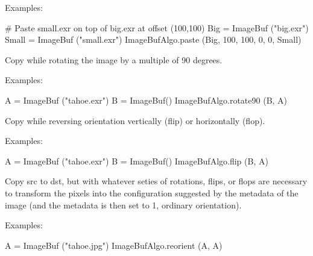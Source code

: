 \smallskip
\noindent Examples:
\begin{code}
    # Paste small.exr on top of big.exr at offset (100,100)
    Big = ImageBuf ("big.exr")
    Small = ImageBuf ("small.exr")
    ImageBufAlgo.paste (Big, 100, 100, 0, 0, Small)
\end{code}
\apiend


 
 
 
Copy while rotating the image by a multiple of 90 degrees.

\smallskip
\noindent Examples:
\begin{code}
    A = ImageBuf ("tahoe.exr")
    B = ImageBuf()
    ImageBufAlgo.rotate90 (B, A)
\end{code}
\apiend



 
 
Copy while reversing orientation vertically (flip) or horizontally (flop).

\smallskip
\noindent Examples:
\begin{code}
    A = ImageBuf ("tahoe.exr")
    B = ImageBuf()
    ImageBufAlgo.flip (B, A)
\end{code}
\apiend


 

Copy {\cf src} to {\cf dst}, but with whatever seties of rotations, flips,
or flops are necessary to transform the pixels into the configuration
suggested by the  metadata of the image (and the
 metadata is then set to 1, ordinary orientation).

\smallskip
\noindent Examples:
\begin{code}
    A = ImageBuf ("tahoe.jpg")
    ImageBufAlgo.reorient (A, A)
\end{code}
\apiend


